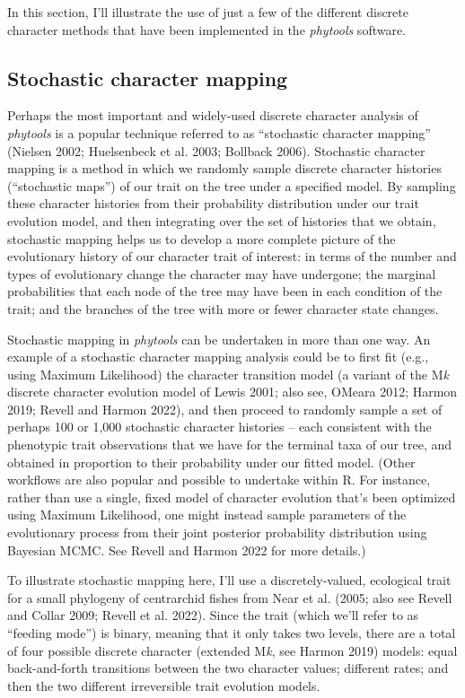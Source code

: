 \documentclass[fleqn,10pt,lineno]{wlpeerj} %
\begin{document}
In this section, I'll illustrate the use of just a few of the different discrete character methods that have been implemented in the \emph{phytools} software.

\hypertarget{stochastic-character-mapping}{%
\subsection{Stochastic character mapping}\label{stochastic-character-mapping}}

Perhaps the most important and widely-used discrete character analysis of \emph{phytools} is a popular technique referred to as ``stochastic character mapping'' (Nielsen 2002; Huelsenbeck et al. 2003; Bollback 2006). Stochastic character mapping is a method in which we randomly sample discrete character histories (``stochastic maps'') of our trait on the tree under a specified model. By sampling these character histories from their probability distribution under our trait evolution model, and then integrating over the set of histories that we obtain, stochastic mapping helps us to develop a more complete picture of the evolutionary history of our character trait of interest: in terms of the number and types of evolutionary change the character may have undergone; the marginal probabilities that each node of the tree may have been in each condition of the trait; and the branches of the tree with more or fewer character state changes.

Stochastic mapping in \emph{phytools} can be undertaken in more than one way. An example of a stochastic character mapping analysis could be to first fit (e.g., using Maximum Likelihood) the character transition model (a variant of the M\emph{k} discrete character evolution model of Lewis 2001; also see, OMeara 2012; Harmon 2019; Revell and Harmon 2022), and then proceed to randomly sample a set of perhaps 100 or 1,000 stochastic character histories -- each consistent with the phenotypic trait observations that we have for the terminal taxa of our tree, and obtained in proportion to their probability under our fitted model. (Other workflows are also popular and possible to undertake within R. For instance, rather than use a single, fixed model of character evolution that's been optimized using Maximum Likelihood, one might instead sample parameters of the evolutionary process from their joint posterior probability distribution using Bayesian MCMC. See Revell and Harmon 2022 for more details.)

To illustrate stochastic mapping here, I'll use a discretely-valued, ecological trait for a small phylogeny of centrarchid fishes from Near et al. (2005; also see Revell and Collar 2009; Revell et al. 2022). Since the trait (which we'll refer to as ``feeding mode'') is binary, meaning that it only takes two levels, there are a total of four possible discrete character (extended M\emph{k}, see Harmon 2019) models: equal back-and-forth transitions between the two character values; different rates; and then the two different irreversible trait evolution models.
\end{document}
